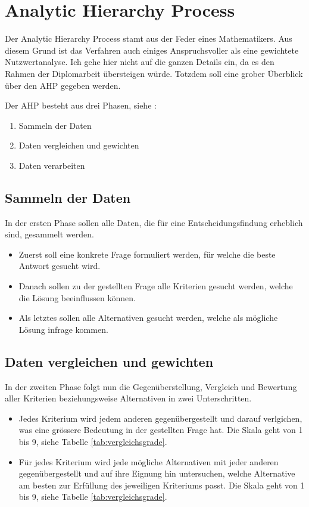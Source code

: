   \section{Analytic Hierarchy Process}
  
  Der Analytic Hierarchy Process stamt aus der Feder eines Mathematikers. Aus
  diesem Grund ist das Verfahren auch einiges Anspruchsvoller als eine
  gewichtete Nutzwertanalyse. Ich gehe hier nicht auf die ganzen Details ein, da
  es den Rahmen der Diplomarbeit übersteigen würde. Totzdem soll eine grober
  Überblick über den \ac{AHP} gegeben werden.
  
  Der \ac{AHP} besteht aus drei Phasen, siehe \cite{AnalyticHierarchyProcess}: 
  
  \begin{enumerate}
    \item Sammeln der Daten
    \item Daten vergleichen und gewichten
    \item Daten verarbeiten
  \end{enumerate}
  
  \subsection{Sammeln der Daten}
  
  In der ersten Phase sollen alle Daten, die für eine Entscheidungsfindung
  erheblich sind, gesammelt werden.
  
  \begin{itemize}
    \item Zuerst soll eine konkrete Frage formuliert werden, für welche die
    beste Antwort gesucht wird.
    \item Danach sollen zu der gestellten Frage alle Kriterien  gesucht werden,
    welche die Lösung beeinflussen können.
    \item Als letztes sollen alle Alternativen gesucht werden, welche als
    mögliche Lösung infrage kommen.
  \end{itemize}
  
  \subsection{Daten vergleichen und gewichten}
  
  In der zweiten Phase folgt nun die Gegenüberstellung, Vergleich und Bewertung
  aller Kriterien beziehungsweise Alternativen in zwei Unterschritten.
  
  \begin{itemize}
    \item Jedes Kriterium wird jedem anderen gegenübergestellt und darauf
    verlgichen, was eine grössere Bedeutung in der gestellten Frage hat. Die
    Skala geht von 1 bis 9, siehe Tabelle \ref{tab:vergleichsgrade}.
    \item Für jedes Kriterium wird jede mögliche Alternativen mit jeder anderen
    gegenübergestellt und auf ihre Eignung hin untersuchen, welche Alternative
    am besten zur Erfüllung des jeweiligen Kriteriums passt. Die Skala geht von
    1 bis 9, siehe Tabelle \ref{tab:vergleichsgrade}.
  \end{itemize}
  
